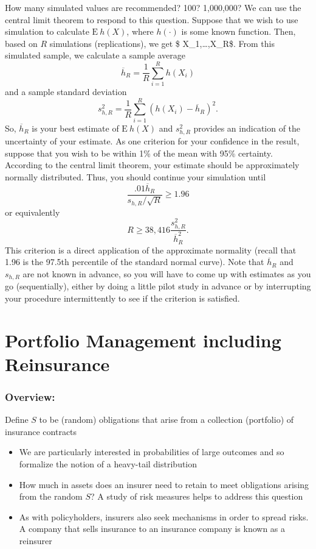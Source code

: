 \documentclass[]{book}
\begin{document}
How many simulated values are recommended? 100? 1,000,000? We can use
the central limit theorem to respond to this question. Suppose that we
wish to use simulation to calculate \(\mathrm{E~}h(X)\), where
\(h(\cdot)\) is some known function. Then, based on \(R\) simulations
(replications), we get \$ X\_1,\ldots,X\_R\$. From this simulated
sample, we calculate a sample average
\[\overline{h}_R=\frac{1}{R}\sum_{i=1}^{R} h(X_i)\] and a sample
standard deviation
\[s_{h,R}^2 = \frac{1}{R} \sum_{i=1}^{R}\left( h(X_i) -\overline{h}_R
\right) ^2.\] So, \(\overline{h}_R\) is your best estimate of
\(\mathrm{E~}h(X)\) and \(s_{h,R}^2\) provides an indication of the
uncertainty of your estimate. As one criterion for your confidence in
the result, suppose that you wish to be within 1\% of the mean with 95\%
certainty. According to the central limit theorem, your estimate should
be approximately normally distributed. Thus, you should continue your
simulation until \[\frac{.01\overline{h}_R}{s_{h,R}/\sqrt{R}}\geq 1.96\]
or equivalently \[R \geq 38,416\frac{s_{h,R}^2}{\overline{h}_R^2}.\]
This criterion is a direct application of the approximate normality
(recall that 1.96 is the 97.5th percentile of the standard normal
curve). Note that \(\overline{h}_R\) and \(s_{h,R}\) are not known in
advance, so you will have to come up with estimates as you go
(sequentially), either by doing a little pilot study in advance or by
interrupting your procedure intermittently to see if the criterion is
satisfied.

\chapter{Portfolio Management including
Reinsurance}\label{portfolio-management-including-reinsurance}

\subsection{Overview:}\label{overview}

Define \(S\) to be (random) obligations that arise from a collection
(portfolio) of insurance contracts

\begin{itemize}
\item
  We are particularly interested in probabilities of large outcomes and
  so formalize the notion of a heavy-tail distribution
\item
  How much in assets does an insurer need to retain to meet obligations
  arising from the random \(S\)? A study of risk measures helps to
  address this question
\item
  As with policyholders, insurers also seek mechanisms in order to
  spread risks. A company that sells insurance to an insurance company
  is known as a reinsurer
\end{itemize}
\end{document}
